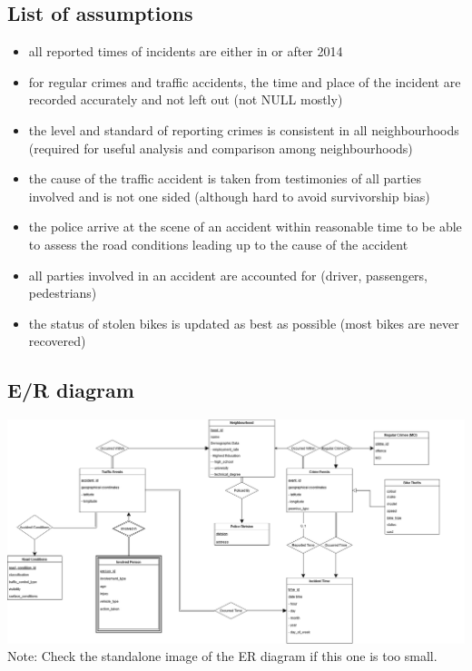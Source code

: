 \documentclass[12pt, a4paper]{article}
\begin{document}
\subsection*{List of assumptions}
\begin{itemize}
    \item all reported times of incidents are either in or after 2014
    \item for regular crimes and traffic accidents, the time and place of the incident are recorded accurately and not left out (not NULL mostly)
    \item the level and standard of reporting crimes is consistent in all neighbourhoods (required for useful analysis and comparison among neighbourhoods)
    \item the cause of the traffic accident is taken from testimonies of all parties involved and is not one sided (although hard to avoid survivorship bias)
    \item the police arrive at the scene of an accident within reasonable time to be able to assess the road conditions leading up to the cause of the accident
    \item all parties involved in an accident are accounted for (driver, passengers, pedestrians)
    \item the status of stolen bikes is updated as best as possible (most bikes are never recovered)
\end{itemize}

\subsection*{E/R diagram}
\color{black}
\includegraphics[scale=0.3]{ER Diagram.png}
Note: Check the standalone image of the ER diagram if this one is too small.
\end{document}
